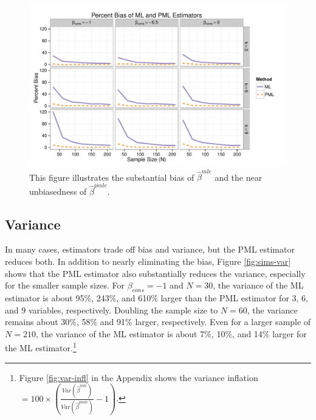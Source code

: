 \documentclass[12pt]{article}
\begin{document}
\begin{figure}[h]
\begin{center}
\includegraphics[width = \textwidth]{figs/sims-percent-bias.pdf}
\caption{This figure illustrates the substantial bias of $\hat{\beta}^{mle}$ and the near unbiasedness of $\hat{\beta}^{pmle}$.}\label{fig:sims-coef-perc-bias}
\end{center}
\end{figure}

\subsection*{Variance}

In many cases, estimators trade off bias and variance, but the PML estimator reduces both.
In addition to nearly eliminating the bias, Figure \ref{fig:sims-var} shows that the PML estimator also substantially reduces the variance, especially for the smaller sample sizes.
For $\beta_{cons} = -1$ and $N = 30$, the variance of the ML estimator is about 95\%, 243\%, and 610\% larger than the PML estimator for 3, 6, and 9 variables, respectively.
Doubling the sample size to $N = 60$, the variance remains about 30\%, 58\% and 91\% larger, respectively. 
Even for a larger sample of $N = 210$, the variance of the ML estimator is about 7\%, 10\%, and 14\% larger for the ML estimator.\footnote{Figure \ref{fig:var-infl} in the Appendix shows the variance inflation $= 100 \times \left(\frac{Var(\hat{\beta} ^{mle})}{Var(\hat{\beta}^{pmle})} - 1\right)$.}
\end{document}
